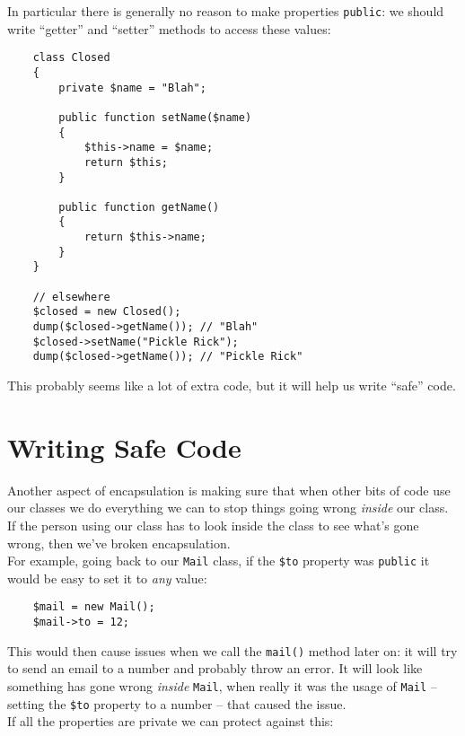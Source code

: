 In particular there is generally no reason to make properties \texttt{public}: we should write ``getter'' and ``setter'' methods to access these values:

\begin{verbatim}
    class Closed
    {
        private $name = "Blah";

        public function setName($name)
        {
            $this->name = $name;
            return $this;
        }

        public function getName()
        {
            return $this->name;
        }
    }

    // elsewhere
    $closed = new Closed();
    dump($closed->getName()); // "Blah"
    $closed->setName("Pickle Rick");
    dump($closed->getName()); // "Pickle Rick"
\end{verbatim}

This probably seems like a lot of extra code, but it will help us write ``safe'' code.


\section{Writing Safe Code}

Another aspect of encapsulation is making sure that when other bits of code use our classes we do everything we can to stop things going wrong \textit{inside} our class. If the person using our class has to look inside the class to see what's gone wrong, then we've broken encapsulation.
\\

For example, going back to our \texttt{Mail} class, if the \texttt{\$to} property was \texttt{public} it would be easy to set it to \textit{any} value:

\begin{verbatim}
    $mail = new Mail();
    $mail->to = 12;
\end{verbatim}

This would then cause issues when we call the \texttt{mail()} method later on: it will try to send an email to a number and probably throw an error. It will look like something has gone wrong \textit{inside} \texttt{Mail}, when really it was the usage of \texttt{Mail} – setting the \texttt{\$to} property to a number – that caused the issue.
\\

If all the properties are private we can protect against this:


